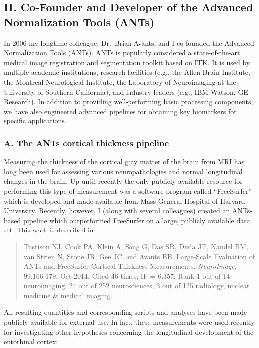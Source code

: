\documentclass[11pt,]{article}
\begin{document}
\subsection{II. Co-Founder and Developer of the Advanced Normalization
Tools
(ANTs)}\label{ii.-co-founder-and-developer-of-the-advanced-normalization-tools-ants}

In 2006 my longtime colleague, Dr.~Brian Avants, and I co-founded the
Advanced Normalization Tools (ANTs). ANTs is popularly considered a
state-of-the-art medical image registration and segmentation toolkit
based on ITK. It is used by multiple academic institutions, research
facilities (e.g., the Allen Brain Institute, the Montreal Neurological
Institute, the Laboratory of Neuroimaging at the University of Southern
California), and industry leaders (e.g., IBM Watson, GE Research). In
addition to providing well-performing basic processing components, we
have also engineered advanced pipelines for obtaining key biomarkers for
specific applications.

\subsubsection{A. The ANTs cortical thickness
pipeline}\label{a.-the-ants-cortical-thickness-pipeline}

Measuring the thickness of the cortical gray matter of the brain from
MRI has long been used for assessing various neuropathologies and normal
longitudinal changes in the brain. Up until recently the only publicly
available resource for performing this type of measurement was a
software program called ``FreeSurfer'' which is developed and made
available from Mass General Hospital of Harvard University. Recently,
however, I (along with several colleagues) created an ANTs-based
pipeline which outperformed FreeSurfer on a large, publicly available
data set. This work is described in

\begin{quote}
Tustison NJ, Cook PA, Klein A, Song G, Das SR, Duda JT, Kandel BM, van
Strien N, Stone JR, Gee JC, and Avants BB. Large-Scale Evaluation of
ANTs and FreeSurfer Cortical Thickness Measurements. \emph{NeuroImage},
99:166-179, Oct 2014. Cited 46 times; IF = 6.357; Rank 1 out of 14
neuroimaging, 24 out of 252 neurosciences, 3 out of 125 radiology,
nuclear medicine \& medical imaging.
\end{quote}

All resulting quantities and corresponding scripts and analyses have
been made publicly available for external use. In fact, these
measurements were used recently for investigating other hypotheses
concerning the longitudinal development of the entorhinal cortex:
\end{document}
